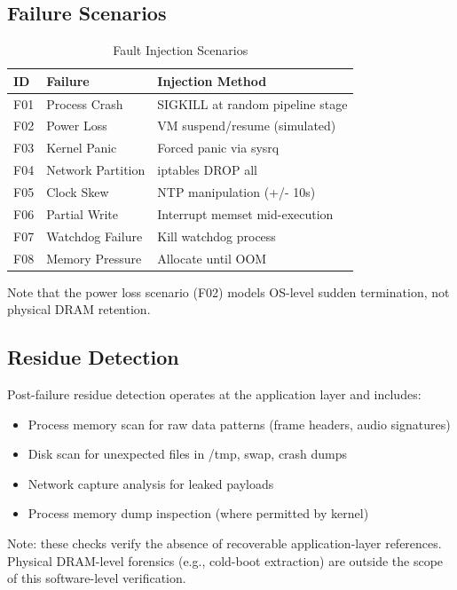 \documentclass[conference]{IEEEtran}
\begin{document}
\subsection{Failure Scenarios}

\begin{table}[h]
\caption{Fault Injection Scenarios}
\centering
\begin{tabular}{p{1cm} p{2cm} p{4cm}}
\toprule
\textbf{ID} & \textbf{Failure} & \textbf{Injection Method} \\
\midrule
F01 & Process Crash & SIGKILL at random pipeline stage \\
F02 & Power Loss & VM suspend/resume (simulated) \\
F03 & Kernel Panic & Forced panic via sysrq \\
F04 & Network Partition & iptables DROP all \\
F05 & Clock Skew & NTP manipulation (+/- 10s) \\
F06 & Partial Write & Interrupt memset mid-execution \\
F07 & Watchdog Failure & Kill watchdog process \\
F08 & Memory Pressure & Allocate until OOM \\
\bottomrule
\end{tabular}
\label{tab:injection}
\end{table}

Note that the power loss scenario (F02) models OS-level sudden termination, not physical DRAM retention.

\subsection{Residue Detection}
Post-failure residue detection operates at the application layer and includes:
\begin{itemize}
    \item Process memory scan for raw data patterns (frame headers, audio signatures)
    \item Disk scan for unexpected files in /tmp, swap, crash dumps
    \item Network capture analysis for leaked payloads
    \item Process memory dump inspection (where permitted by kernel)
\end{itemize}
Note: these checks verify the absence of recoverable application-layer references. Physical DRAM-level forensics (e.g., cold-boot extraction) are outside the scope of this software-level verification.
\end{document}
